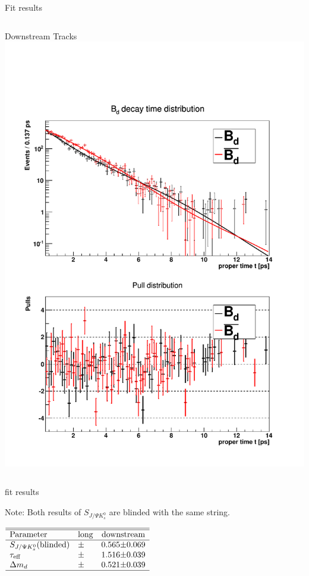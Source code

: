 \documentclass{beamer}
\newcommand{\SJPsi}{S_{J/\Psi K_s^0}}
\begin{document}
\begin{frame}{Fit results}
\begin{columns}
\begin{block}{Downstream Tracks}
	\includegraphics[width=\textwidth]{decay_distribution_ds}
	\end{block}
	\end{columns}

	\end{frame}
	
	\begin{frame}{fit results}
	\begin{alert}{Note:}
	Both results of $\SJPsi$ are blinded with the same string.
	\end{alert}
	\begin{center}
	$\begin{array}{l r@{\pm}l r@{\pm}l}
	\hline \hline
	\text{Parameter} & \multicolumn{2}{c}{\text{long}} & \multicolumn{2}{c}{\text{downstream}}\\ \hline
	\SJPsi (\text{blinded})    & & & 0.565 & 0.069 \\
	\tau_{\text{eff}}       & & & 1.516 & 0.039 \\
	\Delta m_d & & & 0.521 & 0.039 \\
	\hline
	\end{array}$
	\end{center}
	\end{frame}
\end{document}
